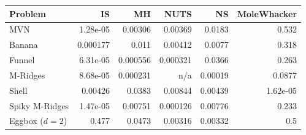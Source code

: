 \begin{tabular}{lrrrrr}
\toprule
Problem & IS & MH & NUTS & NS & MoleWhacker \\
\midrule
MVN & 1.28e-05 & 0.00306 & 0.00369 & 0.0183 & 0.532 \\
Banana & 0.000177 & 0.011 & 0.00412 & 0.0077 & 0.318 \\
Funnel & 6.31e-05 & 0.000556 & 0.000321 & 0.0366 & 0.263 \\
M-Ridges & 8.68e-05 & 0.000231 & n/a & 0.00019 & 0.0877 \\
Shell & 0.00426 & 0.0383 & 0.00844 & 0.00439 & 1.62e-05 \\
Spiky M-Ridges & 1.47e-05 & 0.00751 & 0.000126 & 0.00776 & 0.233 \\
\midrule
Eggbox ($d=2$) & 0.477 & 0.0473 & 0.00316 & 0.00332 & 0.5 \\
\bottomrule
\end{tabular}

